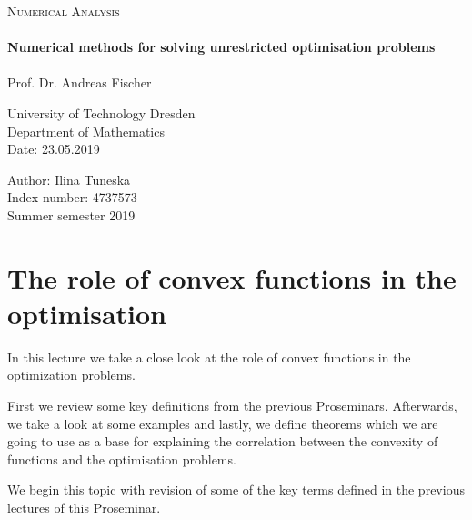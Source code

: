 \documentclass[a4paper, 11pt]{report}
\theoremstyle{break}
\theoremstyle{proofstyle}
\begin{document}
\begin{titlepage}
	\center
	\textsc{\LARGE Numerical Analysis} \\[1cm]
	\hrulefill \\[0.4cm]
	{\huge \bfseries  Numerical methods for solving unrestricted optimisation problems} \\[0.15cm]
	\hrulefill \\[1.5cm]
	\large Prof. Dr. Andreas Fischer \\[1cm]
	
	\begin{normalsize}
		University of Technology Dresden \\
		Department of Mathematics \\
		Date: 23.05.2019   
	\end{normalsize}   
	       
	\vfill
    \Large Author: Ilina Tuneska \\
    \large Index number: 4737573 \\
    \large Summer semester 2019
\end{titlepage}



\setcounter{chapter}{4} %
\chapter{The role of convex functions in the optimisation}

In this lecture we take a close look at the role of convex functions in the optimization problems. 

First we review some key definitions from the previous Proseminars. Afterwards, we take a look at some examples and lastly, we define theorems which we are going to use as a base for explaining the correlation between the convexity of functions and the optimisation problems.


We begin this topic with revision of some of the key terms defined in the previous lectures of this Proseminar.
\end{document}
